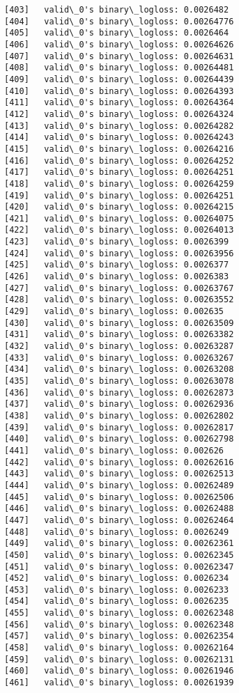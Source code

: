 \documentclass[11pt]{article}
\begin{document}
\begin{Verbatim}[commandchars=\\\{\}]
[403]	valid\_0's binary\_logloss: 0.0026482
[404]	valid\_0's binary\_logloss: 0.00264776
[405]	valid\_0's binary\_logloss: 0.0026464
[406]	valid\_0's binary\_logloss: 0.00264626
[407]	valid\_0's binary\_logloss: 0.00264631
[408]	valid\_0's binary\_logloss: 0.00264481
[409]	valid\_0's binary\_logloss: 0.00264439
[410]	valid\_0's binary\_logloss: 0.00264393
[411]	valid\_0's binary\_logloss: 0.00264364
[412]	valid\_0's binary\_logloss: 0.00264324
[413]	valid\_0's binary\_logloss: 0.00264282
[414]	valid\_0's binary\_logloss: 0.00264243
[415]	valid\_0's binary\_logloss: 0.00264216
[416]	valid\_0's binary\_logloss: 0.00264252
[417]	valid\_0's binary\_logloss: 0.00264251
[418]	valid\_0's binary\_logloss: 0.00264259
[419]	valid\_0's binary\_logloss: 0.00264251
[420]	valid\_0's binary\_logloss: 0.00264215
[421]	valid\_0's binary\_logloss: 0.00264075
[422]	valid\_0's binary\_logloss: 0.00264013
[423]	valid\_0's binary\_logloss: 0.0026399
[424]	valid\_0's binary\_logloss: 0.00263956
[425]	valid\_0's binary\_logloss: 0.0026377
[426]	valid\_0's binary\_logloss: 0.0026383
[427]	valid\_0's binary\_logloss: 0.00263767
[428]	valid\_0's binary\_logloss: 0.00263552
[429]	valid\_0's binary\_logloss: 0.002635
[430]	valid\_0's binary\_logloss: 0.00263509
[431]	valid\_0's binary\_logloss: 0.00263382
[432]	valid\_0's binary\_logloss: 0.00263287
[433]	valid\_0's binary\_logloss: 0.00263267
[434]	valid\_0's binary\_logloss: 0.00263208
[435]	valid\_0's binary\_logloss: 0.00263078
[436]	valid\_0's binary\_logloss: 0.00262873
[437]	valid\_0's binary\_logloss: 0.00262936
[438]	valid\_0's binary\_logloss: 0.00262802
[439]	valid\_0's binary\_logloss: 0.00262817
[440]	valid\_0's binary\_logloss: 0.00262798
[441]	valid\_0's binary\_logloss: 0.002626
[442]	valid\_0's binary\_logloss: 0.00262616
[443]	valid\_0's binary\_logloss: 0.00262513
[444]	valid\_0's binary\_logloss: 0.00262489
[445]	valid\_0's binary\_logloss: 0.00262506
[446]	valid\_0's binary\_logloss: 0.00262488
[447]	valid\_0's binary\_logloss: 0.00262464
[448]	valid\_0's binary\_logloss: 0.0026249
[449]	valid\_0's binary\_logloss: 0.00262361
[450]	valid\_0's binary\_logloss: 0.00262345
[451]	valid\_0's binary\_logloss: 0.00262347
[452]	valid\_0's binary\_logloss: 0.0026234
[453]	valid\_0's binary\_logloss: 0.0026233
[454]	valid\_0's binary\_logloss: 0.0026235
[455]	valid\_0's binary\_logloss: 0.00262348
[456]	valid\_0's binary\_logloss: 0.00262348
[457]	valid\_0's binary\_logloss: 0.00262354
[458]	valid\_0's binary\_logloss: 0.00262164
[459]	valid\_0's binary\_logloss: 0.00262131
[460]	valid\_0's binary\_logloss: 0.00261946
[461]	valid\_0's binary\_logloss: 0.00261939

\end{Verbatim}
\end{document}
